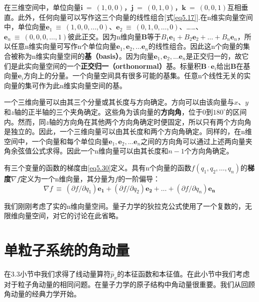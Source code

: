 \documentclass[12pt,a4paper,openany]{ctexbook}
\begin{document}
\begin{flushleft}
在三维空间中，单位向量$\boldsymbol{i}\ =\ (1,0,0)$，$\boldsymbol{j}\ =\ (0,1,0)$，$\boldsymbol{k}\ =\ (0,0,1)$互相垂直。此外，任何向量可以写作这三个向量的线性组合[式\eqref{eq5.17}].在n维实向量空间中，单位向量$\boldsymbol{e}_1\ \equiv\ (1,0,0,\dots,0)$、$\boldsymbol{e}_2\ \equiv\ (0,1,0,\dots,0)$、……、$\boldsymbol{e}_n\ \equiv\ (0,0,0,\dots,1)$彼此正交。因为n维向量$\boldsymbol{B}$等于$B_1\boldsymbol{e}_1+B_2\boldsymbol{e}_2+\dots+B_n\boldsymbol{e}_n$，所以任意n维实向量可写作n个单位向量$\boldsymbol{e}_1,\boldsymbol{e}_2,\dots\boldsymbol{e}_n$的线性组合。因此这n个向量的集合被称为n维实向量空间的\textbf{基（basis）}。因为向量$\boldsymbol{e}_1,\boldsymbol{e}_2,\dots\boldsymbol{e}_n$是正交归一的，故它们是此实向量空间的一个\textbf{正交归一（orthonormal）}基。标量积$\boldsymbol{B}\cdot\boldsymbol{e}_i$给出$\boldsymbol{B}$在基向量$\boldsymbol{e}_i$方向上的分量。一个向量空间具有很多可能的基集。任意n个线性无关的实向量的集可作为此n维实向量空间的基。

一个三维向量可以由其三个分量或其长度与方向确定。方向可以由该向量与$x$、$y$和$z$轴的正半轴的三个夹角确定。这些角为该向量的\textbf{方向角}，位于$0$到$180^\circ$的区间内。然而，同$z$轴的方向角在其他两个方向角确定时便固定，所以只有两个方向角是独立的。因此，一个三维向量可以由其长度和两个方向角确定。同样的，在n维空间中，一个向量和每个单位向量$\boldsymbol{e}_1,\boldsymbol{e}_2,\dots\boldsymbol{e}_n$之间的方向角可以通过上述两向量夹角余弦值公式求得。因此一个n维向量可以由其长度和$n-1$个方向角确定。

有三个变量的函数的梯度由\eqref{eq5.30}定义。具有n个向量的函数$f(q_1,q_2,\dots,q_n)$的\textbf{梯度}$\nabla f$定义为一个n维向量，其分量为$f$的一阶偏导：
\begin{equation*}
    \nabla f\ \equiv\ (\partial f/\partial q_1)\boldsymbol{e_1}+(\partial f/\partial q_2)\boldsymbol{e_2}+\dots+(\partial f/\partial q_n)\boldsymbol{e_n}
\end{equation*}

我们刚刚考虑了实的n维向量空间。量子力学的狄拉克公式使用了一个复数的，无限维向量空间，对它的讨论在此省略。
\end{flushleft}
\section{单粒子系统的角动量}
\begin{flushleft}
    \setlength{\parindent}{2em}
在3.3小节中我们求得了线动量算符$\hat{p}_x$的本征函数和本征值。在此小节中我们考虑对于粒子角动量的相同问题。在量子力学的原子结构中角动量很重要。我们从回顾角动量的经典力学开始。
\end{flushleft}
\end{document}
